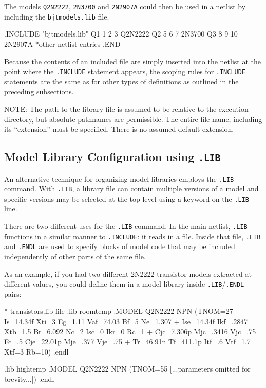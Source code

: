 The models \texttt{Q2N2222}, \texttt{2N3700} and \texttt{2N2907A} could then be
used in a netlist by including the \texttt{bjtmodels.lib} file.

\begin{vquote}
.INCLUDE "bjtmodels.lib"
Q1 1 2 3 Q2N2222
Q2 5 6 7 2N3700
Q3 8 9 10 2N2907A
*other netlist entries
.END
\end{vquote}

Because the contents of an included file are simply inserted into the netlist
at the point where the \texttt{.INCLUDE} statement appears, the scoping rules
for \texttt{.INCLUDE} statements are the same as for other types of definitions
as outlined in the preceding subsections. 

NOTE:	The path to the library file is assumed to be relative to the execution
directory, but absolute pathnames are permissible.  The entire file name,
including its ``extension'' must be specified.  There is no assumed default
extension.

\subsection{Model Library Configuration using \texttt{.LIB}}

An alternative technique for organizing model libraries employs the
\texttt{.LIB} command.  With \texttt{.LIB}, a library file can contain
multiple versions of a model and specific versions may be selected at
the top level using a keyword on the \texttt{.LIB} line.  

There are two different uses for the \texttt{.LIB} command.  In the
main netlist, \texttt{.LIB} functions in a similar manner to
\texttt{.INCLUDE}: it reads in a file.  Inside that file,
\texttt{.LIB} and \texttt{.ENDL} are used to specify blocks of model
code that may be included independently of other parts of the same
file.

As an example, if you had two different 2N2222 transistor models extracted 
at different  values, you could define them in a model library
inside \texttt{.LIB}/\texttt{.ENDL} pairs:

\begin{vquote}
* transistors.lib file
.lib roomtemp
.MODEL Q2N2222 NPN (TNOM=27 Is=14.34f Xti=3 Eg=1.11 Vaf=74.03 Bf=5 Ne=1.307
+  Ise=14.34f Ikf=.2847 Xtb=1.5 Br=6.092 Nc=2 Isc=0 Ikr=0 Rc=1
+  Cjc=7.306p Mjc=.3416 Vjc=.75 Fc=.5 Cje=22.01p Mje=.377 Vje=.75
+  Tr=46.91n Tf=411.1p Itf=.6 Vtf=1.7 Xtf=3 Rb=10)
.endl

.lib hightemp
.MODEL Q2N2222 NPN (TNOM=55 [...parameters omitted for brevity...])
.endl
\end{vquote}

